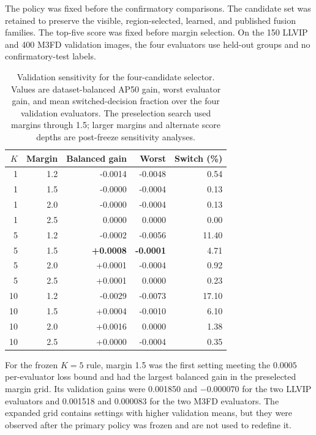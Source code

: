 \documentclass[11pt]{article}
\begin{document}
The policy was fixed before the confirmatory comparisons. The candidate set
was retained to preserve the visible, region-selected, learned, and published
fusion families. The top-five score was fixed before margin selection. On the
150 LLVIP and 400 M3FD validation images, the four evaluators use held-out
groups and no confirmatory-test labels.

\begin{table}[ht]
\centering
\small
\caption{Validation sensitivity for the four-candidate selector. Values are
dataset-balanced AP50 gain, worst evaluator gain, and mean switched-decision
fraction over the four validation evaluators.
The preselection search used margins through 1.5; larger margins and alternate
score depths are post-freeze sensitivity analyses.}
\label{tab:validation-grid}
\begin{tabular}{@{}rrrrr@{}}
\toprule
\(K\) & Margin & Balanced gain & Worst & Switch (\%) \\
\midrule
1 & 1.2 & -0.0014 & -0.0048 & 0.54 \\
1 & 1.5 & -0.0000 & -0.0004 & 0.13 \\
1 & 2.0 & -0.0000 & -0.0004 & 0.13 \\
1 & 2.5 & 0.0000 & 0.0000 & 0.00 \\
5 & 1.2 & -0.0002 & -0.0056 & 11.40 \\
5 & 1.5 & \textbf{+0.0008} & \textbf{-0.0001} & 4.71 \\
5 & 2.0 & +0.0001 & -0.0004 & 0.92 \\
5 & 2.5 & +0.0001 & 0.0000 & 0.23 \\
10 & 1.2 & -0.0029 & -0.0073 & 17.10 \\
10 & 1.5 & +0.0004 & -0.0010 & 6.10 \\
10 & 2.0 & +0.0016 & 0.0000 & 1.38 \\
10 & 2.5 & +0.0000 & -0.0004 & 0.35 \\
\bottomrule
\end{tabular}
\end{table}

For the frozen \(K=5\) rule, margin 1.5 was the first setting meeting the
\(0.0005\) per-evaluator loss bound and had the largest balanced gain in the
preselected margin grid. Its validation gains were 0.001850 and \(-0.000070\)
for the two LLVIP evaluators and 0.001518 and 0.000083 for the two M3FD
evaluators. The expanded grid contains settings with higher validation means,
but they were observed after the primary policy was frozen and are not used to
redefine it.
\end{document}

